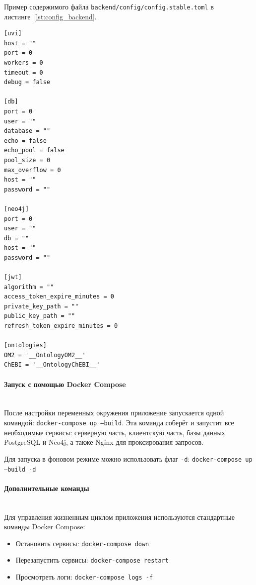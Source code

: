 Пример содержимого файла \texttt{backend/config/config.stable.toml} в листинге~\ref{lst:config_backend}.
\begin{lstlisting}[frame=single, basicstyle=\footnotesize\ttfamily, label={lst:config_backend}, caption={Заполнение конфигурационного файла серверного приложения},captionpos=b, breaklines=true, breakatwhitespace=true]
[uvi]
host = ""
port = 0
workers = 0
timeout = 0
debug = false

[db]
port = 0
user = ""
database = ""
echo = false
echo_pool = false
pool_size = 0
max_overflow = 0
host = ""
password = ""

[neo4j]
port = 0
user = ""
db = ""
host = ""
password = ""

[jwt]
algorithm = ""
access_token_expire_minutes = 0
private_key_path = ""
public_key_path = ""
refresh_token_expire_minutes = 0

[ontologies]
OM2 = '__OntologyOM2__'
ChEBI = '__OntologyChEBI__'
\end{lstlisting}

\paragraph{Запуск с помощью Docker Compose} \mbox{}\\

После настройки переменных окружения приложение запускается одной командой: \texttt{docker-compose up --build}.
Эта команда соберёт и запустит все необходимые сервисы: серверную часть, клиентскую часть, базы данных PostgreSQL и Neo4j, а также Nginx для проксирования запросов.

Для запуска в фоновом режиме можно использовать флаг \texttt{-d}: \texttt{docker-compose up --build -d}

\paragraph{Дополнительные команды} \mbox{}\\

Для управления жизненным циклом приложения используются стандартные команды Docker Compose:
\begin{itemize}
\item Остановить сервисы: \texttt{docker-compose down}
\item Перезапустить сервисы: \texttt{docker-compose restart}
\item Просмотреть логи: \texttt{docker-compose logs -f}
\end{itemize}

